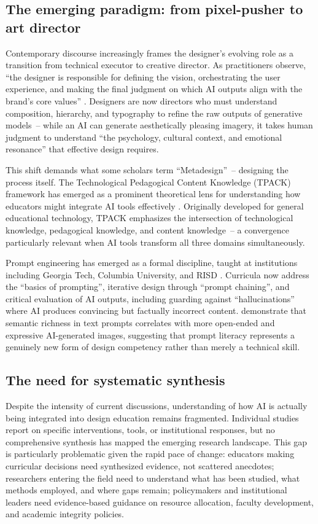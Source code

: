 \documentclass[ed]{acnsart}
\begin{document}
\subsection{The emerging paradigm: from pixel-pusher to art director}

Contemporary discourse increasingly frames the designer's evolving role as a transition from technical executor to creative director. As practitioners observe, ``the designer is responsible for defining the vision, orchestrating the user experience, and making the final judgment on which AI outputs align with the brand's core values'' \cite{Turchi2023}. Designers are now directors who must understand composition, hierarchy, and typography to refine the raw outputs of generative models~-- while an AI can generate aesthetically pleasing imagery, it takes human judgment to understand ``the psychology, cultural context, and emotional resonance'' that effective design requires.

This shift demands what some scholars term ``Metadesign''~-- designing the process itself. The Technological Pedagogical Content Knowledge (TPACK) framework has emerged as a prominent theoretical lens for understanding how educators might integrate AI tools effectively \cite{Lee2024, Bower2017}. Originally developed for general educational technology, TPACK emphasizes the intersection of technological knowledge, pedagogical knowledge, and content knowledge~-- a convergence particularly relevant when AI tools transform all three domains simultaneously.

Prompt engineering has emerged as a formal discipline, taught at institutions including Georgia Tech, Columbia University, and RISD \cite{MedelVera2025}. Curricula now address the ``basics of prompting'', iterative design through ``prompt chaining'', and critical evaluation of AI outputs, including guarding against ``hallucinations'' where AI produces convincing but factually incorrect content. \citet{MedelVera2025} demonstrate that semantic richness in text prompts correlates with more open-ended and expressive AI-generated images, suggesting that prompt literacy represents a genuinely new form of design competency rather than merely a technical skill.

\subsection{The need for systematic synthesis}

Despite the intensity of current discussions, understanding of how AI is actually being integrated into design education remains fragmented. Individual studies report on specific interventions, tools, or institutional responses, but no comprehensive synthesis has mapped the emerging research landscape. This gap is particularly problematic given the rapid pace of change: educators making curricular decisions need synthesized evidence, not scattered anecdotes; researchers entering the field need to understand what has been studied, what methods employed, and where gaps remain; policymakers and institutional leaders need evidence-based guidance on resource allocation, faculty development, and academic integrity policies.
\end{document}
